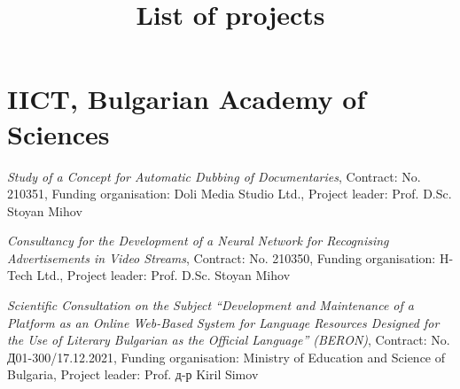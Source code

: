 \documentclass[a4paper,12pt]{article}
\title{\textbf{List of projects}}
\date{}
\begin{document}
	\maketitle
	\section*{IICT, Bulgarian Academy of Sciences}
	\begin{description}[leftmargin=!,labelwidth=\widthof{\textbf{2021--2023}},align=right]
		\item[\textbf{2023}] \emph{Study of a Concept for Automatic Dubbing of Documentaries}, Contract: No. 210351, Funding organisation: Doli Media Studio Ltd., Project leader: Prof. D.Sc. Stoyan Mihov
		\item[\textbf{2023}] \emph{Consultancy for the Development of a Neural Network for Recognising Advertisements in Video Streams}, Contract: No. 210350, Funding organisation: H-Tech Ltd., Project leader: Prof. D.Sc. Stoyan Mihov
		\item[\textbf{2021--2023}] \emph{Scientific Consultation on the Subject ``Development and Maintenance of a Platform as an Online Web-Based System for Language Resources Designed for the Use of Literary Bulgarian as the Official Language'' (BERON)}, Contract: No. Д01-300/17.12.2021, Funding organisation: Ministry of Education and Science of Bulgaria, Project leader: Prof. д-р Kiril Simov

\end{description}
\end{document}

